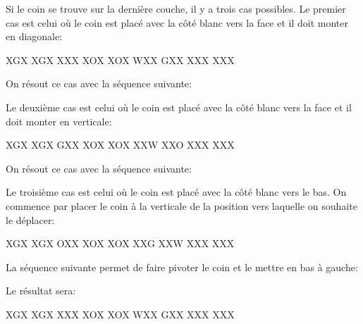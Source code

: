 \documentclass[10pt,paper=a5,pagesize]{scrbook}
\begin{document}
Si le coin se trouve sur la dernière couche, il y a trois cas possibles.
Le premier cas est celui où le coin est placé avec la côté blanc vers
la face et il doit monter en diagonale: 

\begin{center}  	
  	\RubikFaceRight%
  	{X}{G}{X}%
  	{X}{G}{X}%
  	{X}{X}{X}
  	\RubikFaceFront%
  	{X}{O}{X}%
  	{X}{O}{X}%
  	{W}{X}{X}
  	\RubikFaceDown%
  	{G}{X}{X}%
  	{X}{X}{X}%
  	{X}{X}{X}
  	
\end{center} 

On résout ce cas avec la séquence suivante:

Le deuxième cas est celui où le coin est placé avec la côté blanc vers
la face et il doit monter en verticale: 

\begin{center}
	\RubikFaceRight%
	{X}{G}{X}%
	{X}{G}{X}%
	{G}{X}{X}
	\RubikFaceFront%
	{X}{O}{X}%
	{X}{O}{X}%
	{X}{X}{W}
	\RubikFaceDown%
	{X}{X}{O}%
	{X}{X}{X}%
	{X}{X}{X}
	
\end{center} 

On résout ce cas avec la séquence suivante:


Le troisième cas est celui où le coin est placé avec la côté blanc vers
le bas. On commence par placer le coin à la verticale de la position
vers laquelle on souhaite le déplacer:

\begin{center}
	\RubikFaceRight%
	{X}{G}{X}%
	{X}{G}{X}%
	{O}{X}{X}
	\RubikFaceFront%
	{X}{O}{X}%
	{X}{O}{X}%
	{X}{X}{G}
	\RubikFaceDown%
	{X}{X}{W}%
	{X}{X}{X}%
	{X}{X}{X}
	
\end{center} 

La séquence suivante permet de faire pivoter le coin et le mettre en bas à gauche: 

Le résultat sera:

\begin{center}
	\RubikFaceRight%
	{X}{G}{X}%
	{X}{G}{X}%
	{X}{X}{X}
	\RubikFaceFront%
	{X}{O}{X}%
	{X}{O}{X}%
	{W}{X}{X}
	\RubikFaceDown%
	{G}{X}{X}%
	{X}{X}{X}%
	{X}{X}{X}
	
\end{center} 
\end{document}
